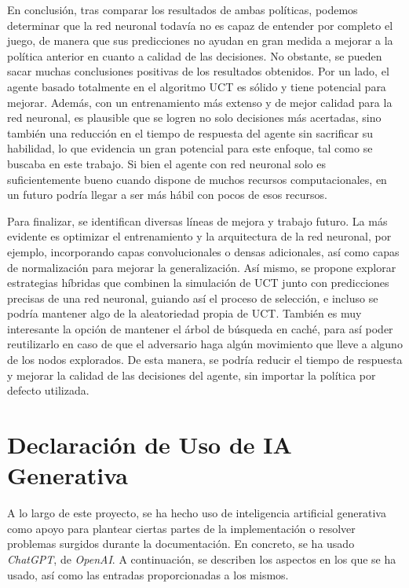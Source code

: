 \documentclass[conference,a4paper]{IEEEtran}
\begin{document}
En conclusión, tras comparar los resultados de ambas políticas, podemos determinar que la red neuronal todavía no es capaz de entender por completo el juego, 
de manera que sus predicciones no ayudan en gran medida a mejorar a la política anterior en cuanto a calidad de las decisiones. No obstante, se pueden sacar 
muchas conclusiones positivas de los resultados obtenidos. Por un lado, el agente basado totalmente en el algoritmo UCT es sólido y tiene potencial para mejorar. 
Además, con un entrenamiento más extenso y de mejor calidad para la red neuronal, es plausible que se logren no solo decisiones más acertadas, sino también una 
reducción en el tiempo de respuesta del agente sin sacrificar su habilidad, lo que evidencia un gran potencial para este enfoque, tal como se buscaba en este trabajo. 
Si bien el agente con red neuronal solo es suficientemente bueno cuando dispone de muchos recursos computacionales, en un futuro podría llegar a ser más hábil con pocos de esos recursos.

Para finalizar, se identifican diversas líneas de mejora y trabajo futuro. La más evidente es optimizar el entrenamiento y la arquitectura de la red neuronal, 
por ejemplo, incorporando capas convolucionales o densas adicionales, así como capas de normalización para mejorar la generalización. Así mismo, se propone explorar 
estrategias híbridas que combinen la simulación de UCT junto con predicciones precisas de una red neuronal, guiando así el proceso de selección, e incluso se podría 
mantener algo de la aleatoriedad propia de UCT. También es muy interesante la opción de mantener el árbol de búsqueda en caché, para así poder reutilizarlo en caso 
de que el adversario haga algún movimiento que lleve a alguno de los nodos explorados. De esta manera, se podría reducir el tiempo de respuesta y mejorar la calidad 
de las decisiones del agente, sin importar la política por defecto utilizada.

\section{Declaración de Uso de IA Generativa}

A lo largo de este proyecto, se ha hecho uso de inteligencia artificial generativa como apoyo para plantear ciertas partes de la implementación o resolver problemas surgidos 
durante la documentación. En concreto, se ha usado \emph{ChatGPT}, de \emph{OpenAI}. A continuación, se describen los aspectos en los que se ha usado, así como las entradas proporcionadas a los mismos.
\end{document}
